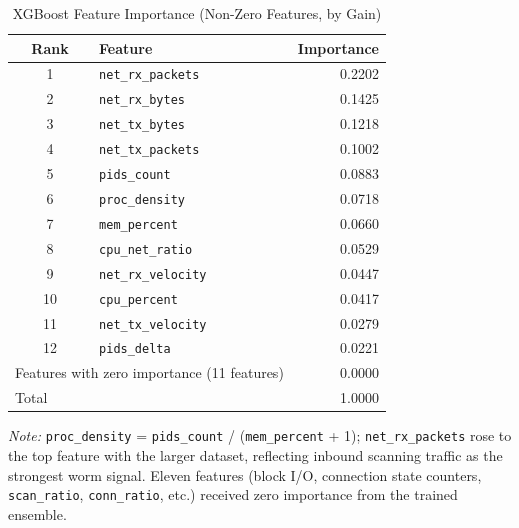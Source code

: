 \begin{table}[ht]
\centering
\caption{XGBoost Feature Importance (Non-Zero Features, by Gain)}
\label{tab:feature_importance}
\begin{tabular}{clr}
\toprule
\textbf{Rank} & \textbf{Feature} & \textbf{Importance} \\
\midrule
1  & \texttt{net\_rx\_packets}   & 0.2202 \\
2  & \texttt{net\_rx\_bytes}     & 0.1425 \\
3  & \texttt{net\_tx\_bytes}     & 0.1218 \\
4  & \texttt{net\_tx\_packets}   & 0.1002 \\
5  & \texttt{pids\_count}        & 0.0883 \\
6  & \texttt{proc\_density}      & 0.0718 \\
7  & \texttt{mem\_percent}       & 0.0660 \\
8  & \texttt{cpu\_net\_ratio}    & 0.0529 \\
9  & \texttt{net\_rx\_velocity}  & 0.0447 \\
10 & \texttt{cpu\_percent}       & 0.0417 \\
11 & \texttt{net\_tx\_velocity}  & 0.0279 \\
12 & \texttt{pids\_delta}        & 0.0221 \\
\midrule
\multicolumn{2}{l}{Features with zero importance (11 features)} & 0.0000 \\
\midrule
\multicolumn{2}{l}{Total} & 1.0000 \\
\bottomrule
\end{tabular}
\begin{minipage}{\linewidth}
\vspace{4pt}
\small
\textit{Note:} \texttt{proc\_density} = \texttt{pids\_count} / (\texttt{mem\_percent} + 1);
\texttt{net\_rx\_packets} rose to the top feature with the larger dataset, reflecting
inbound scanning traffic as the strongest worm signal. Eleven features (block I/O,
connection state counters, \texttt{scan\_ratio}, \texttt{conn\_ratio}, etc.) received
zero importance from the trained ensemble.
\end{minipage}
\end{table}



